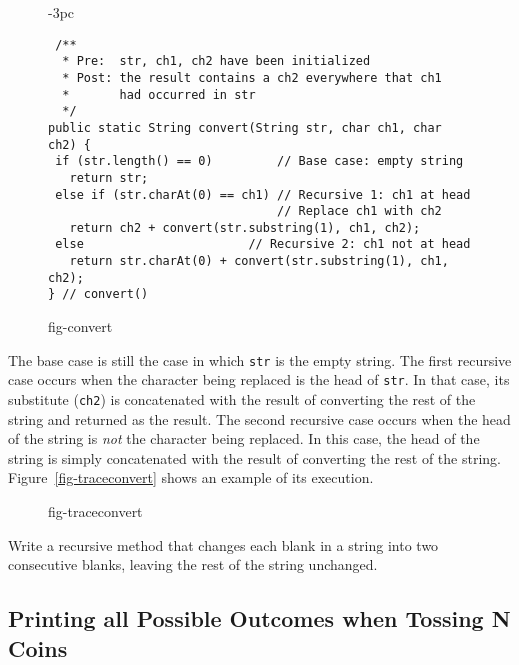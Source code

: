 \begin{figure}[htb]
\jjjprogstart
\begin{jjjlistingleft}[29pc]{-3pc}
\begin{lstlisting}
 /**
  * Pre:  str, ch1, ch2 have been initialized
  * Post: the result contains a ch2 everywhere that ch1 
  *       had occurred in str
  */
public static String convert(String str, char ch1, char ch2) {
 if (str.length() == 0)         // Base case: empty string
   return str;
 else if (str.charAt(0) == ch1) // Recursive 1: ch1 at head
                                // Replace ch1 with ch2
   return ch2 + convert(str.substring(1), ch1, ch2); 
 else                       // Recursive 2: ch1 not at head
   return str.charAt(0) + convert(str.substring(1), ch1, ch2);
} // convert()
\end{lstlisting}
\end{jjjlistingleft}
{fig-convert}
\end{figure}

The base case is still the case in which {\tt str} is the empty
string.  The first recursive case occurs when the character being
replaced is the head of {\tt str}. In that case, 
its substitute ({\tt ch2}) is concatenated with the result of
converting the rest of the string and returned as the result.   The second recursive case occurs
when the head of the string is {\it not} the character being
replaced.  In this case, the head of the string is simply concatenated
with the result of converting the rest of the
string.  Figure~\ref{fig-traceconvert} shows an example of its
execution.

\begin{figure}[h!]
 {fig-traceconvert}
\end{figure}

\pagebreak
{}
\begin{SSTUDY}

\item Write a recursive method that changes
each blank in a string into two consecutive blanks, leaving the rest
of the string \mbox{unchanged.}

\end{SSTUDY}

\subsection{Printing all Possible Outcomes when Tossing N Coins}


